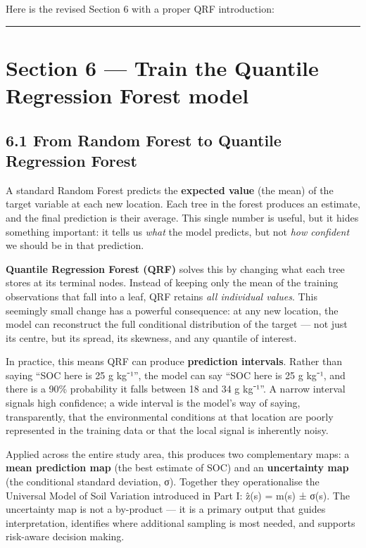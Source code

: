\documentclass[
  10pt,
  b5paper,
  oneside]{book}
\begin{document}
Here is the revised Section 6 with a proper QRF introduction:

\begin{center}\rule{0.5\linewidth}{0.5pt}\end{center}

\section*{Section 6 --- Train the Quantile Regression Forest model}\label{section-6-train-the-quantile-regression-forest-model}

\subsection*{6.1 From Random Forest to Quantile Regression Forest}\label{from-random-forest-to-quantile-regression-forest}

A standard Random Forest predicts the \textbf{expected value} (the mean) of the target variable at each new location. Each tree in the forest produces an estimate, and the final prediction is their average. This single number is useful, but it hides something important: it tells us \emph{what} the model predicts, but not \emph{how confident} we should be in that prediction.

\textbf{Quantile Regression Forest (QRF)} solves this by changing what each tree stores at its terminal nodes. Instead of keeping only the mean of the training observations that fall into a leaf, QRF retains \emph{all individual values}. This seemingly small change has a powerful consequence: at any new location, the model can reconstruct the full conditional distribution of the target --- not just its centre, but its spread, its skewness, and any quantile of interest.

In practice, this means QRF can produce \textbf{prediction intervals}. Rather than saying ``SOC here is 25 g kg⁻¹'', the model can say ``SOC here is 25 g kg⁻¹, and there is a 90\% probability it falls between 18 and 34 g kg⁻¹''. A narrow interval signals high confidence; a wide interval is the model's way of saying, transparently, that the environmental conditions at that location are poorly represented in the training data or that the local signal is inherently noisy.

Applied across the entire study area, this produces two complementary maps: a \textbf{mean prediction map} (the best estimate of SOC) and an \textbf{uncertainty map} (the conditional standard deviation, σ). Together they operationalise the Universal Model of Soil Variation introduced in Part I: ẑ(s) = m(s) ± σ(s). The uncertainty map is not a by-product --- it is a primary output that guides interpretation, identifies where additional sampling is most needed, and supports risk-aware decision making.
\end{document}
